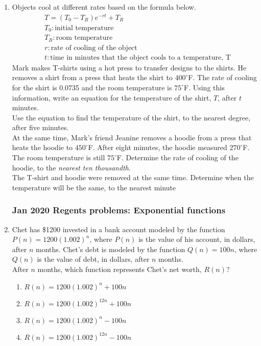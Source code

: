 \documentclass[12pt, twoside]{article}
\begin{document}
\begin{enumerate}[itemsep=0.5cm]
\newpage
\item Objects cool at different rates based on the formula below. %
\begin{align*}
&T = (T_0 - T_R)e^{-rt} + T_R \\
&T_0: \text{initial temperature} \\
&T_R: \text{room temperature} \\
&r: \text{rate of cooling of the object} \\
&t: \text{time in minutes that the object cools to a temperature, T}
\end{align*}
Mark makes T-shirts using a hot press to transfer designs to the shirts. He removes a shirt from
a press that heats the shirt to $400^\circ$F. The rate of cooling for the shirt is 0.0735 and the room temperature is $75^\circ$F. Using this information, write an equation for the temperature of the shirt,
$T$, after $t$ minutes. \\[4cm]
Use the equation to find the temperature of the shirt, to the nearest degree, after five minutes. \\[4cm]
At the same time, Mark’s friend Jeanine removes a hoodie from a press that heats the hoodie to $450^\circ$F. After eight minutes, the hoodie measured $270^\circ$F. The room temperature is still $75^\circ$F. Determine the rate of cooling of the hoodie, to the \emph{nearest ten thousandth}. \\[4cm]
The T-shirt and hoodie were removed at the same time. Determine when the temperature will be the same, to the nearest minute

\newpage
\subsubsection*{Jan 2020 Regents problems: Exponential functions}

\item Chet has \$1200 invested in a bank account modeled by the function 
$P(n) = 1200(1.002)^n$, where $P(n)$ is the value of his account, in dollars, 
after $n$ months. Chet's debt is modeled by the function $Q(n) = 100n$, 
where $Q(n)$ is the value of debt, in dollars, after $n$ months. \\
After $n$ months, which function represents Chet's net worth, $R(n)$?
\begin{enumerate}
    \item $R(n) = 1200(1.002)^n + 100n$
    \item $R(n) = 1200(1.002)^{12n} + 100n$
    \item $R(n) = 1200(1.002)^n - 100n$
    \item $R(n) = 1200(1.002)^{12n} - 100n$
\end{enumerate}


\end{enumerate}
\end{document}
